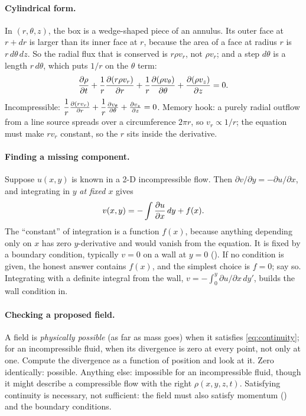 \paragraph{Cylindrical form.} In $(r,\theta,z)$, the box is a wedge-shaped piece of an annulus. Its outer face at $r + dr$ is larger than its inner face at $r$, because the area of a face at radius $r$ is $r\,d\theta\,dz$. So the radial flux that is conserved is $r\rho v_r$, not $\rho v_r$; and a step $d\theta$ is a length $r\,d\theta$, which puts $1/r$ on the $\theta$ term:
\begin{equation}
\frac{\partial \rho}{\partial t} + \frac{1}{r}\frac{\partial (r\rho v_r)}{\partial r} + \frac{1}{r}\frac{\partial (\rho v_\theta)}{\partial \theta} + \frac{\partial (\rho v_z)}{\partial z} = 0 .
\label{eq:continuitycyl}
\end{equation}
Incompressible: $\dfrac{1}{r}\frac{\partial (r v_r)}{\partial r} + \dfrac{1}{r}\frac{\partial v_\theta}{\partial \theta} + \frac{\partial v_z}{\partial z} = 0$. Memory hook: a purely radial outflow from a line source spreads over a circumference $2\pi r$, so $v_r \propto 1/r$; the equation must make $r v_r$ constant, so the $r$ sits inside the derivative.

\paragraph{Finding a missing component.} Suppose $u(x,y)$ is known in a 2-D incompressible flow. Then $\partial v/\partial y = -\partial u/\partial x$, and integrating in $y$ \emph{at fixed $x$} gives
\[
v(x,y) = -\int \frac{\partial u}{\partial x}\,dy + f(x) .
\]
The ``constant'' of integration is a function $f(x)$, because anything depending only on $x$ has zero $y$-derivative and would vanish from the equation. It is fixed by a boundary condition, typically $v = 0$ on a wall at $y = 0$ (). If no condition is given, the honest answer contains $f(x)$, and the simplest choice is $f = 0$; say so. Integrating with a definite integral from the wall, $v = -\int_0^y \partial u/\partial x\,dy'$, builds the wall condition in.

\paragraph{Checking a proposed field.} A field is \emph{physically possible} (as far as mass goes) when it satisfies \eqref{eq:continuity}; for an incompressible fluid, when its divergence is zero at every point, not only at one. Compute the divergence as a function of position and look at it. Zero identically: possible. Anything else: impossible for an incompressible fluid, though it might describe a compressible flow with the right $\rho(x,y,z,t)$. Satisfying continuity is necessary, not sufficient: the field must also satisfy momentum () and the boundary conditions.

